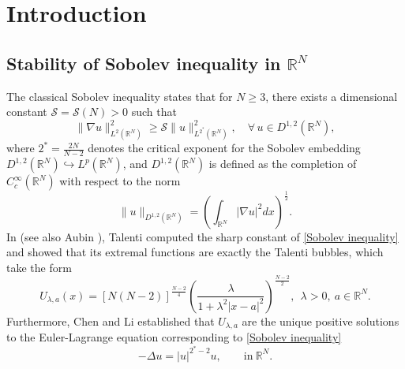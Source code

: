 \documentclass[11pt]{article}
\begin{document}
\begin{abstract}
\smallskip
\emph{\bf Keywords:}  Remainder terms; Quantitative stability; Nonlocal Sobolev inequality; Hardy-Littlewood-Sobolev inequality; Heisenberg group.


\emph{\bf 2020 Mathematics Subject Classification:} 35B35; 35A23; 45E10.


\end{abstract}

\section{Introduction}
\subsection{Stability of Sobolev inequality in $\mathbb{R}^{N}$}
The classical Sobolev inequality
states that for $N\geq3$, there exists a dimensional constant $\mathcal{S}=\mathcal{S}(N)>0$ such that
\begin{equation}\label{Sobolev inequality}
	\|\nabla u\|_{L^{2}(\mathbb{R}^{N})}^{2}\geq \mathcal{S}\|u\|_{L^{2^{\ast}}(\mathbb{R}^{N})}^{2},\quad \forall \, u\in{D}^{1,2}(\mathbb{R}^{N}),
	\end{equation}
where $2^{\ast}=\frac{2N}{N-2}$ denotes the critical exponent for the Sobolev embedding $D^{1,2}(\mathbb{R}^{N})\hookrightarrow L^{p}(\mathbb{R}^{N})$, and $D^{1,2}(\mathbb{R}^N)$ is defined as the completion of $C_c^\infty(\mathbb{R}^{N})$ with
respect to the norm
\begin{equation*}
\|u\|_{D^{1,2}(\mathbb{R}^{N})}=\left(\int_{\mathbb{R}^{N}}|\nabla u|^{2}{d}x\right)^{\frac{1}{2}}.
\end{equation*}
In \cite{T76} (see also Aubin \cite{A76}), Talenti computed the sharp constant of \eqref{Sobolev inequality} and showed that its extremal functions are exactly the Talenti bubbles, which take the form
\begin{equation*}%
U_{\lambda,a}(x)=[N(N-2)]^{\frac{N-2}{4}}\left(\frac{\lambda}{1+\lambda^{2}|x-a|^{2}}\right)
^{\frac{N-2}{2}},~~\lambda>0,~a\in\mathbb{R}^{N}.
\end{equation*}
Furthermore, Chen and Li \cite{CL91} established that $U_{\lambda,a}$ are the unique
positive solutions to the Euler-Lagrange equation corresponding to \eqref{Sobolev inequality}
\begin{equation}\label{limit1'}
  -\Delta u=|u|^{2^*-2}u,\qquad \mathrm{in}~\mathbb{R}^{N}.
\end{equation}
\end{document}
